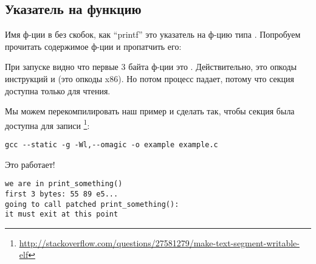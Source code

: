 \subsection{Указатель на функцию}

Имя ф-ции в \CCpp{} без скобок, как ``printf'' это указатель на ф-цию типа .
Попробуем прочитать содержимое ф-ции и пропатчить его:



При запуске видно что первые 3 байта ф-ции это .
Действительно, это опкоды инструкций  и  (это опкоды x86).
Но потом процесс падает, потому что секция  доступна только для чтения.

Мы можем перекомпилировать наш пример и сделать так, чтобы секция  была доступна для записи
\footnote{\url{http://stackoverflow.com/questions/27581279/make-text-segment-writable-elf}}:

\begin{lstlisting}
gcc --static -g -Wl,--omagic -o example example.c
\end{lstlisting}

Это работает!

\begin{lstlisting}
we are in print_something()
first 3 bytes: 55 89 e5...
going to call patched print_something():
it must exit at this point
\end{lstlisting}

